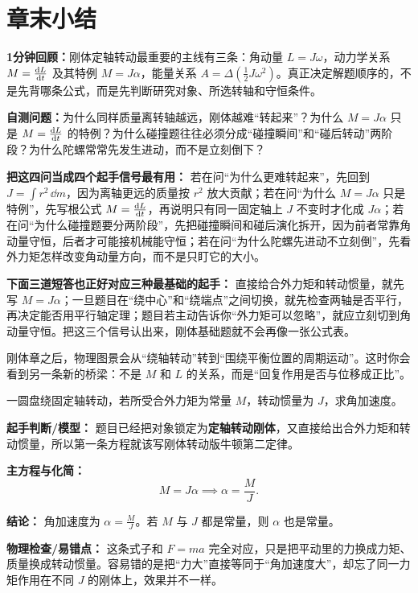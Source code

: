 \documentclass[lang=cn,11pt]{elegantbook}
\newcommand{\bridge}[1]{\begin{note}#1\end{note}}
\newcommand{\summaryline}[1]{\par\noindent\textbf{1分钟回顾：}#1\par}
\newcommand{\chapterselfcheck}[1]{\par\noindent\textbf{自测问题：}#1\par}
\begin{document}
\section{章末小结}

\summaryline{刚体定轴转动最重要的主线有三条：角动量 \(L=J\omega\)，动力学关系 \(M=\dv{L}{t}\) 及其特例 \(M=J\alpha\)，能量关系 \(A=\Delta\left(\frac12 J\omega^2\right)\)。真正决定解题顺序的，不是先背哪条公式，而是先判断研究对象、所选转轴和守恒条件。}
\chapterselfcheck{为什么同样质量离转轴越远，刚体越难“转起来”？为什么 \(M=J\alpha\) 只是 \(M=\dv{L}{t}\) 的特例？为什么碰撞题往往必须分成“碰撞瞬间”和“碰后转动”两阶段？为什么陀螺常常先发生进动，而不是立刻倒下？}
\begin{note}
\textbf{把这四问当成四个起手信号最有用：} 若在问“为什么更难转起来”，先回到 \(J=\int r^2\,\dd m\)，因为离轴更远的质量按 \(r^2\) 放大贡献；若在问“为什么 \(M=J\alpha\) 只是特例”，先写根公式 \(M=\dv{L}{t}\)，再说明只有同一固定轴上 \(J\) 不变时才化成 \(J\alpha\)；若在问“为什么碰撞题要分两阶段”，先把碰撞瞬间和碰后演化拆开，因为前者常靠角动量守恒，后者才可能接机械能守恒；若在问“为什么陀螺先进动不立刻倒”，先看外力矩怎样改变角动量方向，而不是只盯它的大小。
\end{note}
\begin{note}
\textbf{下面三道短答也正好对应三种最基础的起手：} 直接给合外力矩和转动惯量，就先写 \(M=J\alpha\)；一旦题目在“绕中心”和“绕端点”之间切换，就先检查两轴是否平行，再决定能否用平行轴定理；题目若主动告诉你“外力矩可以忽略”，就应立刻切到角动量守恒。把这三个信号认出来，刚体基础题就不会再像一张公式表。
\end{note}
\bridge{刚体章之后，物理图景会从“绕轴转动”转到“围绕平衡位置的周期运动”。这时你会看到另一条新的桥梁：不是 \(M\) 和 \(L\) 的关系，而是“回复作用是否与位移成正比”。}

\begin{exercise}[]
一圆盘绕固定轴转动，若所受合外力矩为常量 \(M\)，转动惯量为 \(J\)，求角加速度。
\end{exercise}

\begin{solution}
\textbf{起手判断/模型：} 题目已经把对象锁定为\textbf{定轴转动刚体}，又直接给出合外力矩和转动惯量，所以第一条方程就该写刚体转动版牛顿第二定律。

\textbf{主方程与化简：}
\[
M=J\alpha \implies \alpha=\frac{M}{J}.
\]

\textbf{结论：} 角加速度为 \(\alpha=\frac{M}{J}\)。若 \(M\) 与 \(J\) 都是常量，则 \(\alpha\) 也是常量。

\textbf{物理检查/易错点：} 这条式子和 \(F=ma\) 完全对应，只是把平动里的力换成力矩、质量换成转动惯量。容易错的是把“力大”直接等同于“角加速度大”，却忘了同一力矩作用在不同 \(J\) 的刚体上，效果并不一样。
\end{solution}
\end{document}
